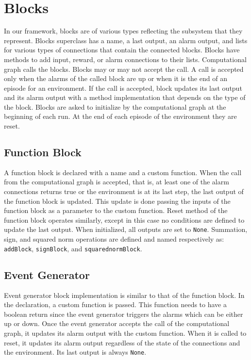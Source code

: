 \section{Blocks}
In our framework, blocks are of various types reflecting the subsystem that they represent. Blocks superclass has a name, a last output, an alarm output, and lists for various types of connections that contain the connected blocks. Blocks have methods to add input, reward, or alarm connections to their lists. Computational graph calls the blocks. Blocks may or may not accept the call. A call is accepted only when the alarms of the called block are up or when it is the end of an episode for an environment. If the call is accepted, block updates its last output and its alarm output with a method implementation that depends on the type of the block. Blocks are asked to initialize by the computational graph at the beginning of each run. At the end of each episode of the environment they are reset. 

\subsection{Function Block}
A function block is declared with a name and a custom function. When the call from the computational graph is accepted, that is, at least one of the alarm connections returns true or the environment is at its last step, the last output of the function block is updated. This update is done passing the inputs of the function block as a parameter to the custom function. Reset method of the function block operates similarly, except in this case no conditions are defined to update the last output. When initialized, all outputs are set to \texttt{None}. Summation, sign, and squared norm operations are defined and named respectively as: \texttt{addBlock}, \texttt{signBlock}, and \texttt{squarednormBlock}. 

\subsection{Event Generator}
Event generator block implementation is similar to that of the function block. In the declaration, a custom function is passed. This function needs to have a boolean return since the event generator triggers the alarms which can be either up or down. Once the event generator accepts the call of the computational graph, it updates its alarm output with the custom function. When it is called to reset, it updates its alarm output regardless of the state of the connections and the environment. Its last output is always \texttt{None}. 

